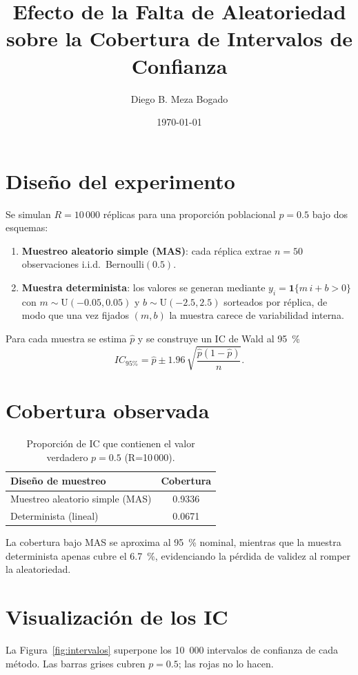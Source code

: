\documentclass[11pt,a4paper]{article}
\title{Efecto de la Falta de Aleatoriedad sobre la Cobertura de Intervalos de Confianza}
\author{Diego B. Meza Bogado}
\date{\today}
\begin{document}
\maketitle
\tableofcontents
\bigskip

\section{Diseño del experimento}
Se simulan $R=10\,000$ réplicas para una proporción poblacional $p=0.5$ bajo dos esquemas:
\begin{enumerate}
  \item \textbf{Muestreo aleatorio simple (MAS)}: cada réplica extrae $n=50$ observaciones i.i.d.~Bernoulli$(0.5)$.  
  \item \textbf{Muestra determinista}: los valores se generan mediante
        $y_i = \mathbf 1\{m\,i + b > 0\}$ con $m\sim\mathrm U(-0.05,0.05)$ y $b\sim\mathrm U(-2.5,2.5)$ sorteados por réplica, de modo que una vez fijados $(m,b)$ la muestra carece de variabilidad interna.
\end{enumerate}
Para cada muestra se estima $\hat p$ y se construye un IC de Wald al 95~\%
\[ IC_{95\%}=\hat p \pm 1.96\,\sqrt{\dfrac{\hat p(1-\hat p)}{n}}. \]

\section{Cobertura observada}
\begin{table}[H]
  \centering
  \caption{Proporción de IC que contienen el valor verdadero $p=0.5$ (R=10\,000).}
  \label{tab:cobertura}
  \begin{tabular}{@{}lc@{}}
    \toprule
    Diseño de muestreo & Cobertura \\
    \midrule
    Muestreo aleatorio simple (MAS) & 0.9336 \\
    Determinista (lineal)           & 0.0671 \\
    \bottomrule
  \end{tabular}
\end{table}
La cobertura bajo MAS se aproxima al 95~\% nominal, mientras que la muestra determinista apenas cubre el 6.7~\%, evidenciando la pérdida de validez al romper la aleatoriedad.

\section{Visualización de los IC}
La Figura~\ref{fig:intervalos} superpone los 10~000 intervalos de confianza de cada método. Las barras grises cubren $p=0.5$; las rojas no lo hacen.
\end{document}
